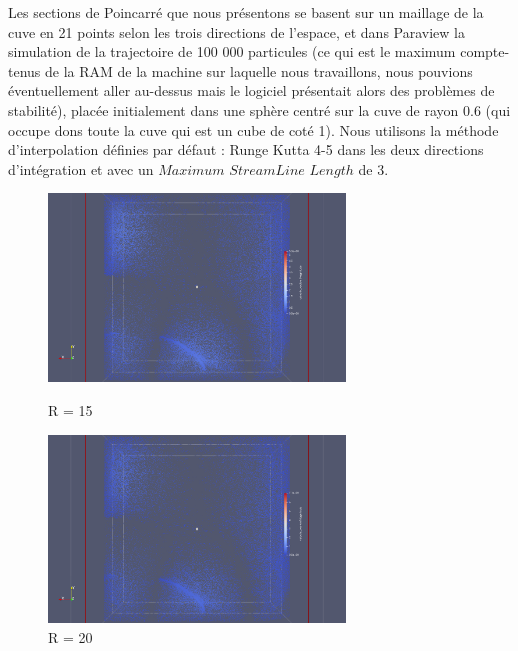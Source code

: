 \documentclass[a4paper,12pt,titlepage]{report}
\begin{document}
\begin{onehalfspace}
Les sections de Poincarré que nous présentons se basent sur un maillage de la cuve en 21 points selon les trois directions de l'espace, et dans Paraview la simulation de la trajectoire de 100 000 particules (ce qui est le maximum compte-tenus de la RAM de la machine sur laquelle nous travaillons, nous pouvions éventuellement aller au-dessus mais le logiciel présentait alors des problèmes de stabilité), placée initialement dans une sphère centré sur la cuve de rayon 0.6 (qui occupe dons toute la cuve qui est un cube de coté 1). 
Nous utilisons la méthode d'interpolation définies par défaut : Runge Kutta 4-5 dans les deux directions d'intégration et avec un $Maximum$ $StreamLine$ $Length$ de 3. 

\begin{figure}[!h]
    \begin{minipage}[c]{.46\linewidth}
        \centering
        \includegraphics[height = 5cm, keepaspectratio]{graphes/Paraview/section_pioncarre_R_15.png}
        \caption{R = 15}
    \end{minipage}
    \hfill%
    \begin{minipage}[c]{.46\linewidth}
        \centering
        \includegraphics[height = 5cm, keepaspectratio]{graphes/Paraview/section_pioncarre_R_20.png}
        \caption{R = 20}
    \end{minipage}
\end{figure}
\begin{figure}[!h]
    \begin{minipage}[c]{.46\linewidth}
        \centering

\end{minipage}
\end{figure}
\end{onehalfspace}
\end{document}
